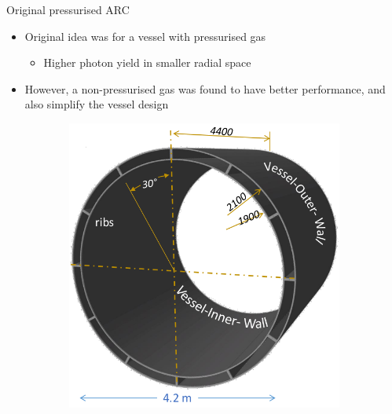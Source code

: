 \documentclass{beamer}
\begin{document}
\begin{frame}{Original pressurised ARC}
  \begin{itemize}
    \setlength\itemsep{0.5em}
    \item{Original idea was for a vessel with pressurised gas}
    \begin{itemize}
      \item{Higher photon yield in smaller radial space}
    \end{itemize}
    \item{However, a non-pressurised gas was found to have better performance, and also simplify the vessel design}
  \end{itemize}
  \begin{figure}
    \centering
    \begin{subfigure}{0.35\textwidth}
      \includegraphics[width = 1.0\textwidth]{Plots/CarbonFiberVessel.png}
    \end{subfigure}%
    \hspace{0.7cm}
    \begin{subfigure}{0.35\textwidth}

\end{subfigure}
\end{figure}
\end{frame}
\end{document}
